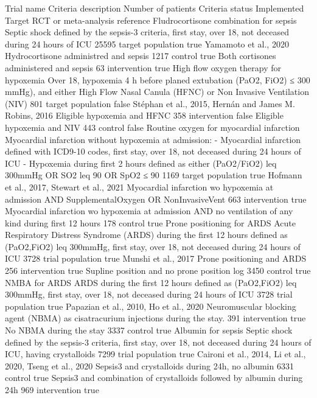 Trial name Criteria description Number of
patients
Criteria
status Implemented Target RCT or
meta-analysis reference
Fludrocortisone
combination for sepsis
Septic shock defined by the sepsis-3 criteria,
first stay, over 18, not deceased during 24 hours of ICU 25595 target population true Yamamoto et al., 2020
Hydrocortisone administred and sepsis 1217 control true
Both cortisones administered and sepsis 63 intervention true
High flow
oxygen therapy
for hypoxemia
Over 18, hypoxemia 4 h before planed extubation
(PaO2, FiO2) ≤ 300 mmHg), and either High Flow
Nasal Canula (HFNC) or Non Invasive Ventilation (NIV)
801 target population false Stéphan et al., 2015,
Hernán and James M. Robins, 2016
Eligible hypoxemia and HFNC 358 intervention false
Eligible hypoxemia and NIV 443 control false
Routine oxygen for
myocardial infarction
Myocardial infarction without hypoxemia at admission:
- Myocardial infarction defined with ICD9-10 codes,
first stay, over 18, not deceased during 24 hours of ICU
- Hypoxemia during first 2 hours defined as either
(PaO2/FiO2) leq 300mmHg OR SO2 leq 90
OR SpO2 ≤ 90
1169 target population true Hofmann et al., 2017,
Stewart et al., 2021
Myocardial infarction wo hypoxemia at admission AND
SupplementalOxygen OR NonInvasiveVent 663 intervention true
Myocardial infarction wo hypoxemia at admission AND
no ventilation of any kind during first 12 hours 178 control true
Prone positioning
for ARDS
Acute Respiratory Distress Syndrome (ARDS) during
the first 12 hours defined as (PaO2,FiO2) leq 300mmHg,
first stay, over 18, not deceased during 24 hours of ICU
3728 trial population true Munshi et al., 2017
Prone positioning and ARDS 256 intervention true
Supline position and no prone position log 3450 control true
NMBA for ARDS
ARDS during the first 12 hours defined as
(PaO2,FiO2) leq 300mmHg, first stay,
over 18, not deceased during 24 hours of ICU
3728 trial population true Papazian et al., 2010,
Ho et al., 2020
Neuromuscular blocking agent (NBMA) as cisatracurium
injections during the stay. 391 intervention true
No NBMA during the stay 3337 control true
Albumin for sepsis
Septic shock defined by the sepsis-3 criteria,
first stay, over 18, not deceased during 24 hours
of ICU, having crystalloids
7299 trial population true
Caironi et al., 2014,
Li et al., 2020,
Tseng et al., 2020
Sepsis3 and crystalloids during 24h, no albumin 6331 control true
Sepsis3 and combination of crystalloids followed by
albumin during 24h 969 intervention true
